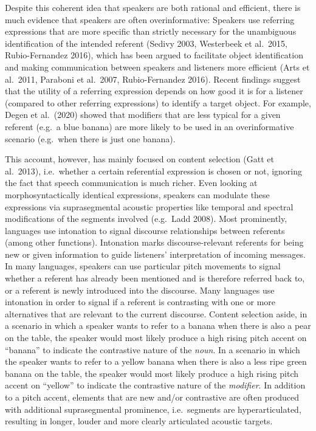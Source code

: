 \documentclass[
  english,
  man]{apa6}
\begin{document}
Despite this coherent idea that speakers are both rational and efficient, there is much evidence that speakers are often overinformative: Speakers use referring expressions that are more specific than strictly necessary for the unambiguous identification of the intended referent (Sedivy 2003, Westerbeek et al.~2015, Rubio-Fernandez 2016), which has been argued to facilitate object identification and making communication between speakers and listeners more efficient (Arts et al.~2011, Paraboni et al.~2007, Rubio-Fernandez 2016).
Recent findings suggest that the utility of a referring expression depends on how good it is for a listener (compared to other referring expressions) to identify a target object.
For example, Degen et al.~(2020) showed that modifiers that are less typical for a given referent (e.g.~a blue banana) are more likely to be used in an overinformative scenario (e.g.~when there is just one banana).

This account, however, has mainly focused on content selection (Gatt et al.~2013), i.e.~whether a certain referential expression is chosen or not, ignoring the fact that speech communication is much richer.
Even looking at morphosyntactically identical expressions, speakers can modulate these expressions via suprasegmental acoustic properties like temporal and spectral modifications of the segments involved (e.g.~Ladd 2008).
Most prominently, languages use intonation to signal discourse relationships between referents (among other functions).
Intonation marks discourse-relevant referents for being new or given information to guide listeners' interpretation of incoming messages.
In many languages, speakers can use particular pitch movements to signal whether a referent has already been mentioned and is therefore referred back to, or a referent is newly introduced into the discourse.
Many languages use intonation in order to signal if a referent is contrasting with one or more alternatives that are relevant to the current discourse.
Content selection aside, in a scenario in which a speaker wants to refer to a banana when there is also a pear on the table, the speaker would most likely produce a high rising pitch accent on \enquote{banana} to indicate the contrastive nature of the \emph{noun}.
In a scenario in which the speaker wants to refer to a yellow banana when there is also a less ripe green banana on the table, the speaker would most likely produce a high rising pitch accent on \enquote{yellow} to indicate the contrastive nature of the \emph{modifier}. In addition to a pitch accent, elements that are new and/or contrastive are often produced with additional suprasegmental prominence, i.e.~segments are hyperarticulated, resulting in longer, louder and more clearly articulated acoustic targets.
\end{document}
